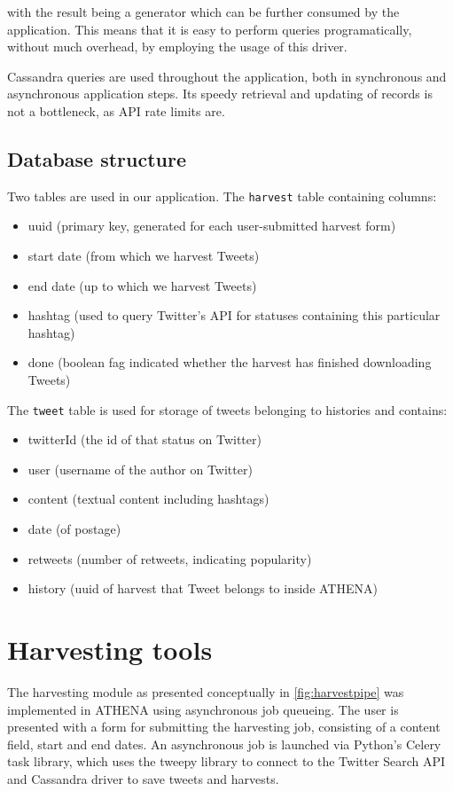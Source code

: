 \documentclass[12pt,a4paper,twoside]{report}
\begin{document}
with the result being a generator which can be further consumed by the application. This means that it is easy to perform queries programatically, without much overhead, by employing the usage of this driver.

Cassandra queries are used throughout the application, both in synchronous and asynchronous application steps. Its speedy retrieval and updating of records is not a bottleneck, as API rate limits are.

\subsection{Database structure}
Two tables are used in our application. The \texttt{harvest} table containing columns:

\begin{itemize}
\item uuid (primary key, generated for each user-submitted harvest form)
\item start date (from which we harvest Tweets)
\item end date (up to which we harvest Tweets)
\item hashtag (used to query Twitter's API for statuses containing this particular hashtag)
\item done (boolean fag indicated whether the harvest has finished downloading Tweets)
\end{itemize}

The \texttt{tweet} table is used for storage of tweets belonging to histories and contains:

\begin{itemize}
\item twitterId (the id of that status on Twitter)
\item user (username of the author on Twitter)
\item content (textual content including hashtags)
\item date (of postage)
\item retweets (number of retweets, indicating popularity)
\item history (uuid of harvest that Tweet belongs to inside ATHENA)
\end{itemize}

\section{Harvesting tools}
The harvesting module as presented conceptually in \ref{fig:harvestpipe} was implemented in ATHENA using asynchronous job queueing. The user is presented with a form for submitting the harvesting job, consisting of a content field, start and end dates. An asynchronous job is launched via Python's Celery task library, which uses the tweepy library to connect to the Twitter Search API and Cassandra driver to save tweets and harvests.
\end{document}
